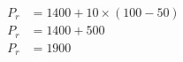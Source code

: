 \documentclass[preview]{standalone}
\begin{document}
\begin{align*}
P_r &= 1400 + 10 \times (100 - 50) \\ P_r &= 1400 + 500 \\ P_r &= 1900
\end{align*}
\end{document}

